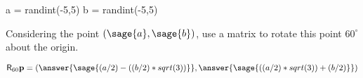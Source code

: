 

\author{Jenny Sheldon \and Bart Snapp}



\makerandom

\begin{sagesilent}
  a = randint(-5,5)
  b = randint(-5,5)
\end{sagesilent}

\begin{exercise}
  Considering the point $(\sage{a},\sage{b})$, use a
  matrix to rotate this point $60^\circ$ about the origin.
  \begin{prompt}
    \[
    \mat{R}_{60}\vec{p} = \left(\answer{\sage{(a / 2 )-((b / 2 ) * sqrt(3) )}},\answer{\sage{(( a / 2 ) * sqrt(3) ) + (b / 2 )}}\right)
    \]
  \end{prompt}
\end{exercise}

